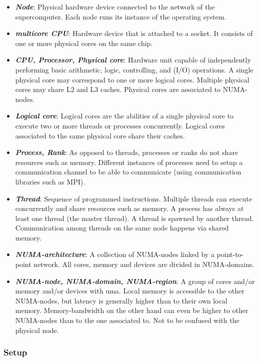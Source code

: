 \documentclass{article}
\theoremstyle{plain} %
\theoremstyle{convention} %
\theoremstyle{remark} %
\def\df#1{\textbf{\textit{#1}}}
\numberwithin{equation}{section}
\begin{document}
\begin{itemize}
    \item \df{Node}: Physical hardware device connected to the network of the supercomputer. Each node runs its instance of the operating system.
    \item \df{multicore CPU}: Hardware device that is attached to a socket. It consists of one or more physical cores on the same chip.
    \item \df{CPU, Processor, Physical core}: Hardware unit capable of independently performing basic arithmetic, logic, controlling, and (I/O) operations. A single physical core may correspond to one or more logical cores. Multiple physical cores may share L2 and L3 caches. Physical cores are associated to NUMA-nodes.
    \item \df{Logical core}: Logical cores are the abilities of a single physical core to execute two or more threads or processes concurrently. Logical cores associated to the same physical core share their caches.
    \item \df{Process, Rank}: As opposed to threads, processes or ranks do not share resources such as memory. Different instances of processes need to setup a communication channel to be able to communicate (using communication libraries such as MPI). 
    \item \df{Thread}: Sequence of programmed instructions. Multiple threads can execute concurrently and share resources such as memory. A process has always at least one thread (the master thread). A thread is spawned by another thread. Communication among threads on the same node happens via shared memory.
    \item \df{NUMA-architecture}: A collection of NUMA-nodes linked by a point-to-point network. All cores, memory and devices are divided in NUMA-domains.
    \item \df{NUMA-node, NUMA-domain, NUMA-region}: A group of cores and/or memory and/or devices with \acrfull{uma}. Local memory is accessible to the other NUMA-nodes, but latency is generally higher than to their own local memory. Memory-bandwidth on the other hand can even be higher to other NUMA-nodes than to the one associated to. Not to be confused with the physical node.
\end{itemize}

\subsubsection{Setup}
\end{document}
